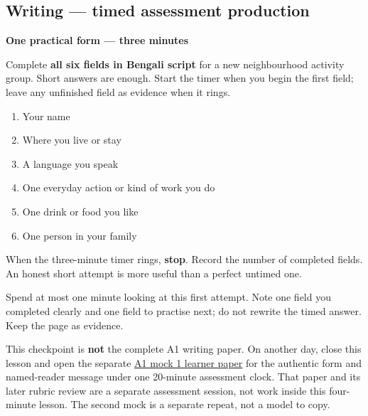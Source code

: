 \subsection*{Writing — timed assessment production}
\textbf{One practical form — three minutes}

Complete \textbf{all six fields in Bengali script} for a new neighbourhood activity group. Short answers are enough. Start the timer when you begin the first field; leave any unfinished field as evidence when it rings.

\begin{enumerate}
\raggedright
  \item Your name
  \item Where you live or stay
  \item A language you speak
  \item One everyday action or kind of work you do
  \item One drink or food you like
  \item One person in your family
\end{enumerate}

When the three-minute timer rings, \textbf{stop}. Record the number of completed fields. An honest short attempt is more useful than a perfect untimed one.

\begin{tcolorbox}[breakable,colback=teal!4,colframe=teal!35!black,title={Before you move on}]
Spend at most one minute looking at this first attempt. Note one field you completed clearly and one field to practise next; do not rewrite the timed answer. Keep the page as evidence.

This checkpoint is \textbf{not} the complete A1 writing paper. On another day, close this lesson and open the separate \href{https://github.com/adhithyan15/coding-adventures/blob/main/code/learning/human-languages/bengali/mocks/a1/mock-1.md}{A1 mock 1 learner paper} for the authentic form and named-reader message under one 20-minute assessment clock. That paper and its later rubric review are a separate assessment session, not work inside this four-minute lesson. The second mock is a separate repeat, not a model to copy.
\end{tcolorbox}
